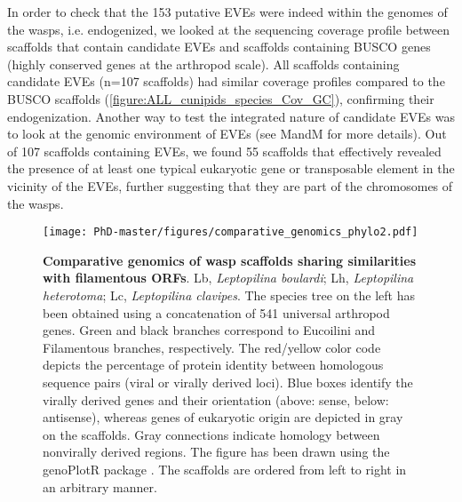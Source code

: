 In order to check that the 153 putative EVEs were indeed within the genomes of the wasps, i.e. endogenized, we looked at the sequencing coverage profile between scaffolds that contain candidate EVEs and scaffolds containing BUSCO genes (highly conserved genes at the arthropod scale). All scaffolds containing candidate EVEs (n=107 scaffolds) had similar coverage profiles compared to the BUSCO scaffolds  (\figurename{\ref{figure:ALL_cunipids_species_Cov_GC}}), confirming their endogenization. Another way to test the integrated nature of candidate EVEs was to look at the genomic environment of EVEs (see MandM for more details). Out of 107 scaffolds containing EVEs, we found 55 scaffolds that effectively revealed the presence of at least one typical eukaryotic gene or transposable element in the vicinity of the EVEs, further suggesting that they are part of the chromosomes of the wasps. 

\begin{figure}[!htpbt]
\texttt{[image: PhD-master/figures/comparative\_genomics\_phylo2.pdf]}\centering
\caption[Paper3:Filamentous EVE synteny in Eucoilini]{\textbf{Comparative genomics of wasp scaffolds sharing similarities with filamentous ORFs}. Lb, \textit{Leptopilina boulardi}; Lh, \textit{Leptopilina heterotoma}; Lc, \textit{Leptopilina clavipes}. The species tree on the left has been obtained using a concatenation of 541 universal arthropod genes. Green and black branches correspond to Eucoilini and Filamentous branches, respectively. The red/yellow color code depicts the percentage of protein identity between homologous sequence pairs (viral or virally derived loci). Blue boxes identify the virally derived genes and their orientation (above: sense, below: antisense), whereas genes of eukaryotic origin are depicted in gray on the scaffolds. Gray connections indicate homology between nonvirally derived regions. The figure has been drawn using the genoPlotR package \citep{guy_genoplotr_2010}. The scaffolds are ordered from left to right in an arbitrary manner.}
\label{figure:comparative_genomics_Cynipoidea_phylo}
\end{figure}


